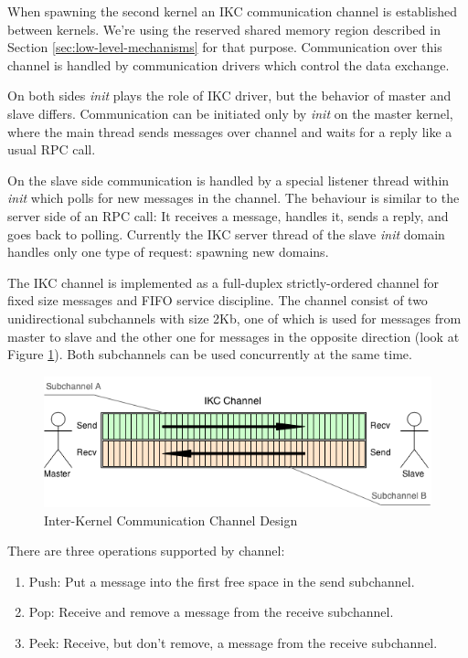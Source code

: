 \documentclass[a4paper,10pt]{article}
\begin{document}
	When spawning the second kernel an IKC communication channel is established between kernels.
	We're using the reserved shared memory region described in Section \ref{sec:low-level-mechanisms} for that purpose.
	Communication over this channel is handled by communication drivers which control the data exchange.
	
	On both sides \emph{init} plays the role of IKC driver, but the behavior of master and slave differs.
	Communication can be initiated only by \emph{init} on the master kernel, where the main thread sends messages over channel and waits for a reply like a usual RPC call.
	
	On the slave side communication is handled by a special listener thread within \emph{init} which polls for new messages in the channel.
	The behaviour is similar to the server side of an RPC call: 
	It receives a message, handles it, sends a reply, and goes back to polling. 
	Currently the IKC server thread of the slave \emph{init} domain handles only one type of request: spawning new domains.
	
	The IKC channel is implemented as a full-duplex strictly-ordered channel for fixed size messages and FIFO service discipline. 
	The channel consist of two unidirectional subchannels with size 2Kb, one of which is used for messages from master to slave and the other one for messages in the opposite direction (look at Figure \ref{fig:ikc}).
	Both subchannels can be used concurrently at the same time.
	
	\begin{figure}[ht]
		\centering
   		\includegraphics[width=\textwidth]{IKC_Structure.png}
		\caption{Inter-Kernel Communication Channel Design}
    		\label{fig:ikc}
	\end{figure} 
		
	There are three operations supported by channel:
	\begin{enumerate}
		\item Push: Put a message into the first free space in the send subchannel. 
		\item Pop: Receive and remove a message from the receive subchannel.
		\item Peek: Receive, but don't remove, a message from the receive subchannel.
	\end{enumerate}
	
\end{document}
